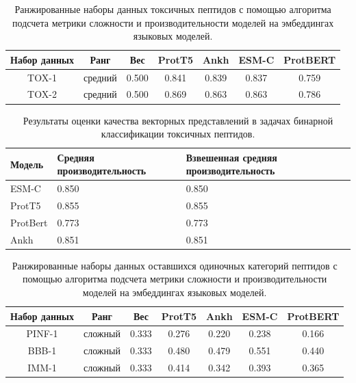 \documentclass[specification,annotation,times]{itmo-student-thesis}
\begin{document}
\begin{table}[h]
\centering
\caption{Ранжированные наборы данных токсичных пептидов с помощью алгоритма подсчета метрики сложности и производительности моделей на эмбеддингах языковых моделей.}
\label{tab:model_performance_tox}

\begin{tabular}{|c|c|c|c|c|c|c|}
\hline
Набор данных & Ранг & Вес & ProtT5 & Ankh & ESM-C & ProtBERT \\
\hline
TOX-1 & средний & 0.500 & 0.841 & 0.839 & 0.837 & 0.759 \\ \hline
TOX-2 & средний & 0.500 & 0.869 & 0.863 & 0.863 & 0.786 \\ \hline

\end{tabular}

\end{table}


\begin{table}[h]
\centering

\caption{Результаты оценки качества векторных представлений в задачах бинарной классификации токсичных пептидов.}
\label{tab:compare_results_tox}
\begin{tabular}{|p{3cm}|p{5cm}|p{5cm}|}
\hline
Модель & Средняя \newline производительность & Взвешенная \newline средняя \newline производительность \\
\hline
ESM-C & 0.850 & 0.850 \\ \hline
ProtT5 & 0.855 & 0.855 \\ \hline
ProtBert & 0.773 & 0.773 \\ \hline
Ankh & 0.851 & 0.851 \\ \hline

\end{tabular}

\end{table}

\begin{table}[h]
\centering
\caption{Ранжированные наборы данных оставшихся одиночных категорий пептидов с помощью алгоритма подсчета метрики сложности и производительности моделей на эмбеддингах языковых моделей.}
\label{tab:model_performance_other}

\begin{tabular}{|c|c|c|c|c|c|c|}
\hline
Набор данных & Ранг & Вес & ProtT5 & Ankh & ESM-C & ProtBERT \\
\hline
PINF-1 & сложный & 0.333 & 0.276 & 0.220 & 0.238 & 0.166 \\ \hline
BBB-1 & сложный & 0.333 & 0.480 & 0.479 & 0.551 & 0.440 \\ \hline
IMM-1 & сложный & 0.333 & 0.414 & 0.342 & 0.393 & 0.365 \\ \hline
\end{tabular}

\end{table}
\end{document}
